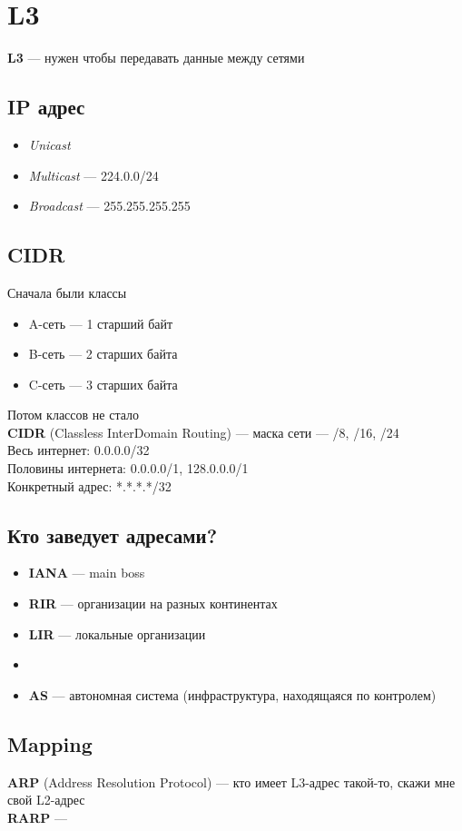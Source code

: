 \section{L3}
\textbf{L3} --- нужен чтобы передавать данные между сетями

\subsection{IP адрес}
\begin{itemize}
    \item \emph{Unicast}
    \item \emph{Multicast} --- 224.0.0/24
    \item \emph{Broadcast} --- 255.255.255.255
\end{itemize}

\subsection{CIDR}
Сначала были классы
\begin{itemize}
    \item A-сеть --- 1 старший байт
    \item B-сеть --- 2 старших байта
    \item C-сеть --- 3 старших байта
\end{itemize}
Потом классов не стало\\
\textbf{CIDR} (Classless InterDomain Routing) --- маска сети --- /8, /16, /24\\
Весь интернет: 0.0.0.0/32\\
Половины интернета: 0.0.0.0/1, 128.0.0.0/1\\
Конкретный адрес: *.*.*.*/32

\subsection{Кто заведует адресами?}
\begin{itemize}
    \item \textbf{IANA} --- main boss
    \item \textbf{RIR} --- организации на разных континентах
    \item \textbf{LIR} --- локальные организации
    \item {}
    \item \textbf{AS} --- автономная система (инфраструктура, находящаяся по контролем)
\end{itemize}

\subsection{Mapping}
\textbf{ARP} (Address Resolution Protocol) --- кто имеет L3-адрес такой-то, скажи мне свой L2-адрес\\
\textbf{RARP} --- 

